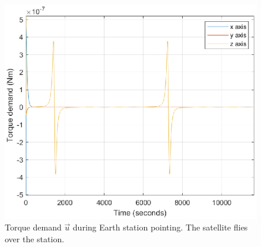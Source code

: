 \begin{figure}[H]
	\centering
	\includegraphics[width=0.7\linewidth]{figures/torque_stationTrack}
	\caption{Torque demand $\vec{u}$ during Earth station pointing. The satellite flies over the station.}
	\label{fig:torque_stationTrack}
\end{figure}


